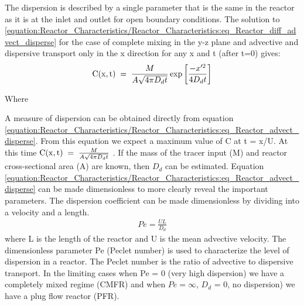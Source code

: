 \documentclass[letterpaper,10pt,english]{sphinxmanual}
\begin{document}
The dispersion is described by a single parameter that is the same in the reactor as it is at the inlet and outlet for open boundary conditions. The solution to \eqref{equation:Reactor_Characteristics/Reactor_Characteristics:eq_Reactor_diff_advect_disperse} for the case of complete mixing in the y-z plane and advective and dispersive transport only in the x direction for any x and t (after t=0) gives:
\begin{equation}\label{equation:Reactor_Characteristics/Reactor_Characteristics:eq_Reactor_advect_disperse}
\begin{split} {\rm C(x,t)\; }={\rm \; }\frac{M}{A\sqrt{4\pi D_{d} t} } \exp \left[\frac{-x'^{2} }{4D_{d} t} \right]\end{split}
\end{equation}\begin{description}
\item[{Where}] \leavevmode
{}

\end{description}

A measure of dispersion can be obtained directly from equation \eqref{equation:Reactor_Characteristics/Reactor_Characteristics:eq_Reactor_advect_disperse}. From this equation we expect a maximum value of C at t = x/U. At this time \({\rm C(x,t)\; }={\rm \; }\frac{M}{A\sqrt{4\pi D_{d} t} }\) . If the mass of the tracer input (M) and reactor cross-sectional area (A) are known, then \(D_{d}\) can be estimated. Equation \eqref{equation:Reactor_Characteristics/Reactor_Characteristics:eq_Reactor_advect_disperse} can be made dimensionless to more clearly reveal the important parameters. The dispersion coefficient can be made dimensionless by dividing into a velocity and a length.
\begin{equation}\label{equation:Reactor_Characteristics/Reactor_Characteristics:eq_Reactor_Pe}
\begin{split} Pe=\frac{UL}{D_{d}}\end{split}
\end{equation}
where L is the length of the reactor and U is the mean advective velocity. The dimensionless parameter Pe (Peclet number) is used to characterize the level of dispersion in a reactor. The Peclet number is the ratio of advective to dispersive transport. In the limiting cases when Pe = 0 (very high dispersion) we have a completely mixed regime (CMFR) and when \(Pe = \mathrm{\infty}\), \(D_{d}\) = 0, no dispersion) we have a plug flow reactor (PFR).
\end{document}
